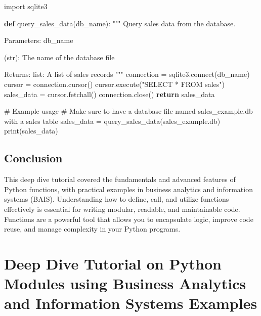 \documentclass[
  letterpaper,
  DIV=11,
  numbers=noendperiod]{scrreprt}
\newenvironment{Shaded}{\begin{snugshade}}{\end{snugshade}}
\newcommand{\BuiltInTok}[1]{\textcolor[rgb]{0.00,0.23,0.31}{#1}}
\newcommand{\CommentTok}[1]{\textcolor[rgb]{0.37,0.37,0.37}{#1}}
\newcommand{\ControlFlowTok}[1]{\textcolor[rgb]{0.00,0.23,0.31}{\textbf{#1}}}
\newcommand{\ExtensionTok}[1]{\textcolor[rgb]{0.00,0.23,0.31}{#1}}
\newcommand{\ImportTok}[1]{\textcolor[rgb]{0.00,0.46,0.62}{#1}}
\newcommand{\KeywordTok}[1]{\textcolor[rgb]{0.00,0.23,0.31}{\textbf{#1}}}
\newcommand{\NormalTok}[1]{\textcolor[rgb]{0.00,0.23,0.31}{#1}}
\newcommand{\OperatorTok}[1]{\textcolor[rgb]{0.37,0.37,0.37}{#1}}
\newcommand{\StringTok}[1]{\textcolor[rgb]{0.13,0.47,0.30}{#1}}
\begin{document}
\begin{Shaded}
\begin{Highlighting}[]
\ImportTok{import}\NormalTok{ sqlite3}

\KeywordTok{def}\NormalTok{ query\_sales\_data(db\_name):}
    \CommentTok{"""}
\CommentTok{    Query sales data from the database.}

\CommentTok{    Parameters:}
\CommentTok{    db\_name}

\CommentTok{ (str): The name of the database file}

\CommentTok{    Returns:}
\CommentTok{    list: A list of sales records}
\CommentTok{    """}
\NormalTok{    connection }\OperatorTok{=}\NormalTok{ sqlite3.}\ExtensionTok{connect}\NormalTok{(db\_name)}
\NormalTok{    cursor }\OperatorTok{=}\NormalTok{ connection.cursor()}
\NormalTok{    cursor.execute(}\StringTok{"SELECT * FROM sales"}\NormalTok{)}
\NormalTok{    sales\_data }\OperatorTok{=}\NormalTok{ cursor.fetchall()}
\NormalTok{    connection.close()}
    \ControlFlowTok{return}\NormalTok{ sales\_data}

\CommentTok{\# Example usage}
\CommentTok{\# Make sure to have a database file named \textquotesingle{}sales\_example.db\textquotesingle{} with a \textquotesingle{}sales\textquotesingle{} table}
\NormalTok{sales\_data }\OperatorTok{=}\NormalTok{ query\_sales\_data(}\StringTok{\textquotesingle{}sales\_example.db\textquotesingle{}}\NormalTok{)}
\BuiltInTok{print}\NormalTok{(sales\_data)}
\end{Highlighting}
\end{Shaded}

\section{Conclusion}\label{conclusion-6}

This deep dive tutorial covered the fundamentals and advanced features
of Python functions, with practical examples in business analytics and
information systems (BAIS). Understanding how to define, call, and
utilize functions effectively is essential for writing modular,
readable, and maintainable code. Functions are a powerful tool that
allows you to encapsulate logic, improve code reuse, and manage
complexity in your Python programs.


\chapter{Deep Dive Tutorial on Python Modules using Business Analytics
and Information Systems
Examples}\label{deep-dive-tutorial-on-python-modules-using-business-analytics-and-information-systems-examples}
\end{document}
